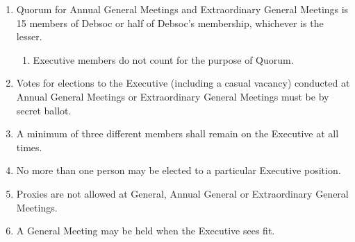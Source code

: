 \begin{enumerate}
\item Quorum for Annual General Meetings and Extraordinary General Meetings is 15 members of Debsoc or half of Debsoc's membership, whichever is the lesser.
  \begin{enumerate}
  \item Executive members do not count for the purpose of Quorum.
  \end{enumerate}

\item Votes for elections to the Executive (including a casual vacancy) conducted at Annual General Meetings or Extraordinary General Meetings must be by secret ballot.

\item A minimum of three different members shall remain on the Executive at all times.

\item No more than one person may be elected to a particular Executive position.

\item Proxies are not allowed at General, Annual General or Extraordinary General Meetings.

\item A General Meeting may be held when the Executive sees fit.
\end{enumerate}

